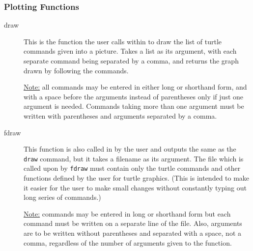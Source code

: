 \subsubsection{Plotting Functions}
\begin{description}
\item[draw]
  This is the function the user calls within {\REDUCE} to
       draw the list of turtle commands given into a picture. Takes a list
       as its argument, with each separate command being separated by a
       comma, and returns the graph drawn by following the commands.

       \underline{Note:} all commands may be entered in either long or
                         shorthand form, and with a space
                         before the arguments instead of parentheses only
                         if just one argument is needed. Commands taking
                         more than one argument must be written with
                         parentheses and arguments separated by a comma.
\item[fdraw]
  This function is also called in {\REDUCE} by the user
       and outputs the same as the \texttt{draw} command, but it takes a
       filename as its argument. The file which is called upon by \texttt{fdraw}
       must contain only the turtle commands and other functions
       defined by the user for turtle graphics. (This is intended to make
       it easier for the user to make small changes without constantly
       typing out long series of commands.)

       \underline{Note:} commands may be entered in long or shorthand form
                         but each command must be written on a separate
                         line of the file. Also, arguments are to be
                         written without parentheses and separated with a
                         space, not a comma, regardless of the number of
                         arguments given to the function.
\end{description}


